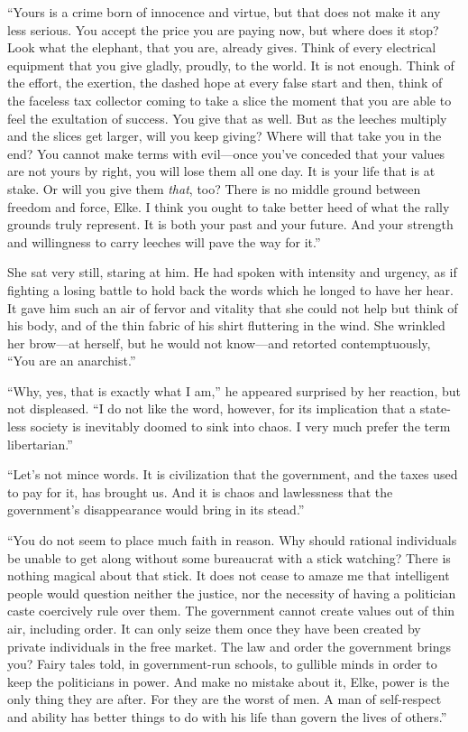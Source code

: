 ``Yours is a crime born of innocence and virtue, but that does not make it any less serious. You accept the price you are paying now, but where does it stop? Look what the elephant, that you are, already gives. Think of every electrical equipment that you give gladly, proudly, to the world. It is not enough. Think of the effort, the exertion, the dashed hope at every false start and then, think of the faceless tax collector coming to take a slice the moment that you are able to feel the exultation of success. You give that as well. But as the leeches multiply and the slices get larger, will you keep giving? Where will that take you in the end? You cannot make terms with evil---once you've conceded that your values are not yours by right, you will lose them all one day. It is your life that is at stake. Or will you give them \emph{that}, too? There is no middle ground between freedom and force, Elke. I think you ought to take better heed of what the rally grounds truly represent. It is both your past and your future. And your strength and willingness to carry leeches will pave the way for it.''

She sat very still, staring at him. He had spoken with intensity and urgency, as if fighting a losing battle to hold back the words which he longed to have her hear. It gave him such an air of fervor and vitality that she could not help but think of his body, and of the thin fabric of his shirt fluttering in the wind. She wrinkled her brow---at herself, but he would not know---and retorted contemptuously, ``You are an anarchist.''

``Why, yes, that is exactly what I am,'' he appeared surprised by her reaction, but not displeased. ``I do not like the word, however, for its implication that a state-less society is inevitably doomed to sink into chaos. I very much prefer the term libertarian.''

``Let's not mince words. It is civilization that the government, and the taxes used to pay for it, has brought us. And it is chaos and lawlessness that the government's disappearance would bring in its stead.''

``You do not seem to place much faith in reason. Why should rational individuals be unable to get along without some bureaucrat with a stick watching? There is nothing magical about that stick. It does not cease to amaze me that intelligent people would question neither the justice, nor the necessity of having a politician caste coercively rule over them. The government cannot create values out of thin air, including order. It can only seize them once they have been created by private individuals in the free market. The law and order the government brings you? Fairy tales told, in government-run schools, to gullible minds in order to keep the politicians in power. And make no mistake about it, Elke, power is the only thing they are after. For they are the worst of men. A man of self-respect and ability has better things to do with his life than govern the lives of others.''

